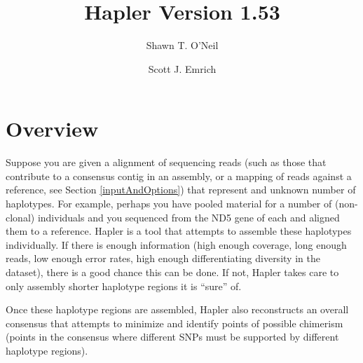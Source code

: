 \documentclass[11pt]{llncs}
\begin{document}
%
%
\mainmatter              %
%
\title{Hapler Version 1.53}
%
%
\author{Shawn T. O'Neil \and Scott J. Emrich}
%
%
%




\maketitle              %


\setcounter{tocdepth}{3}
\tableofcontents

\newpage


%

\section{Overview} 
\label{overview}

Suppose you are given a alignment of sequencing reads (such as those that contribute to a consensus contig in an assembly, or a mapping of reads against 
a reference, see Section 
\ref{inputAndOptions}) that represent and unknown number of haplotypes. For example, perhaps you have pooled material for a number of (non-clonal) 
individuals and you sequenced from the ND5 gene of each and aligned them to a reference. Hapler is a tool that attempts to assemble these 
haplotypes individually. If there is enough information (high enough coverage, long enough reads, low enough error rates, high enough differentiating 
diversity in the dataset), there is a good chance this can be done. If not, Hapler takes care to only assembly shorter haplotype regions it is 
``sure'' of.

Once these haplotype regions are assembled, Hapler also reconstructs an overall consensus that attempts to minimize and identify points of
possible chimerism (points in the 
consensus where different SNPs must be supported by different haplotype regions).
\end{document}
